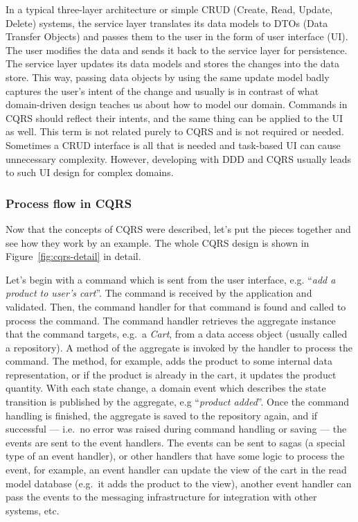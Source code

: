 \documentclass{book}
\begin{document}
In a typical three-layer architecture or simple CRUD (Create, Read,
Update, Delete) systems, the service layer translates its data models to
DTOs (Data Transfer Objects) and passes them to the user in the form of
user interface (UI). The user modifies the data and sends it back to the
service layer for persistence. The service layer updates its data models
and stores the changes into the data store. This way, passing data
objects by using the same update model badly captures the user's intent
of the change and usually is in contrast of what domain-driven design
teaches us about how to model our domain. Commands in CQRS should
reflect their intents, and the same thing can be applied to the UI as
well. This term is not related purely to CQRS and is not required or
needed. Sometimes a CRUD interface is all that is needed and task-based
UI can cause unnecessary complexity. However, developing with DDD and
CQRS usually leads to such UI design for complex domains.


\subsubsection{Process flow in CQRS}\label{process-flow-in-cqrs}

Now that the concepts of CQRS were described, let's put the pieces
together and see how they work by an example. The whole CQRS design is
shown in Figure~\ref{fig:cqrs-detail} in detail.

Let's begin with a command which is sent from the user interface, e.g.
``\emph{add a product to user's cart}''. The command is received by the
application and validated. Then, the command handler for that command is
found and called to process the command. The command handler retrieves
the aggregate instance that the command targets, e.g.~a \emph{Cart},
from a data access object (usually called a repository). A method of the
aggregate is invoked by the handler to process the command. The method,
for example, adds the product to some internal data representation, or
if the product is already in the cart, it updates the product quantity.
With each state change, a domain event which describes the state
transition is published by the aggregate, e.g ``\emph{product added}''.
Once the command handling is finished, the aggregate is saved to the
repository again, and if successful --- i.e.~no error was raised during
command handling or saving --- the events are sent to the event
handlers. The events can be sent to sagas (a special type of an event
handler), or other handlers that have some logic to process the event,
for example, an event handler can update the view of the cart in the
read model database (e.g.~it adds the product to the view), another
event handler can pass the events to the messaging infrastructure for
integration with other systems, etc.
\end{document}
